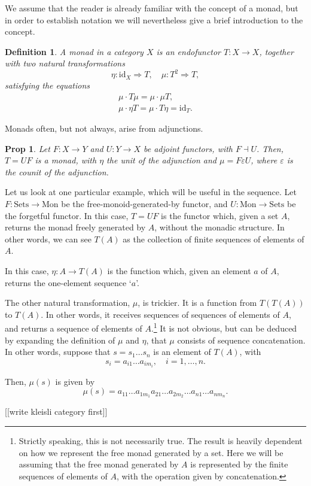 \documentclass[11pt]{article}
\newtheorem{prop}{Prop}
\newtheorem{definition}{Definition}
\theoremstyle{nonumberplain}
\newcommand{\cat}[1]{\mathrm{#1}}
\newcommand{\id}{\mathrm{id}}
\newcommand{\nto}{\Rightarrow}
\begin{document}
We assume that the reader is already familiar with the concept of a monad, but in order to establish notation we will nevertheless give a brief introduction to the concept.

\begin{definition}
A monad in a category $X$ is an endofunctor $T \colon X \to X$, together with two natural transformations
\begin{equation}
\eta \colon \id_X \nto T, \quad \mu \colon T^2 \nto T,
\end{equation}
satisfying the equations
\begin{gather}
\mu \cdot T\mu = \mu \cdot \mu T,\\
\mu \cdot \eta T = \mu \cdot T \eta = \id_T.
\end{gather}
\end{definition}

Monads often, but not always, arise from adjunctions.

\begin{prop}
Let $F \colon X \to Y$ and $U \colon Y \to X$ be adjoint functors, with $F \dashv U$. Then, $T = UF$ is a monad, with $\eta$ the unit of the adjunction and $\mu = F \varepsilon U$, where $\varepsilon$ is the counit of the adjunction.
\end{prop}

Let us look at one particular example, which will be useful in the sequence. Let $F \colon \cat{Sets} \to \cat{Mon}$ be the free-monoid-generated-by functor, and $U \colon \cat{Mon} \to \cat{Sets}$ be the forgetful functor. In this case, $T = UF$ is the functor which, given a set $A$, returns the monad freely generated by $A$, without the monadic structure. In other words, we can see $T(A)$ as the collection of finite sequences of elements of $A$.

In this case, $\eta \colon A \to T(A)$ is the function which, given an element $a$ of $A$, returns the one-element sequence `$a$'.

The other natural transformation, $\mu$, is trickier. It is a function from $T(T(A))$ to $T(A)$. In other words, it receives sequences of sequences of elements of $A$, and returns a sequence of elements of $A$.\footnote{Strictly speaking, this is not necessarily true. The result is heavily dependent on how we represent the free monad generated by a set. Here we will be assuming that the free monad generated by $A$ is represented by the finite sequences of elements of $A$, with the operation given by concatenation.} It is not obvious, but can be deduced by expanding the definition of $\mu$ and $\eta$, that $\mu$ consists of sequence concatenation. In other words, suppose that $s = s_1 \dots s_n$ is an element of $T(A)$, with
\begin{equation}
s_i = a_{i1} \dots a_{i m_i}, \quad i = 1, \dots, n.
\end{equation}

Then, $\mu(s)$ is given by
\begin{equation}
\mu(s) = a_{11} \dots a_{1 m_1} a_{21} \dots a_{2 m_2} \dots a_{n1} \dots a_{n m_n}.
\end{equation}

[[write kleisli category first]]



\end{document}
